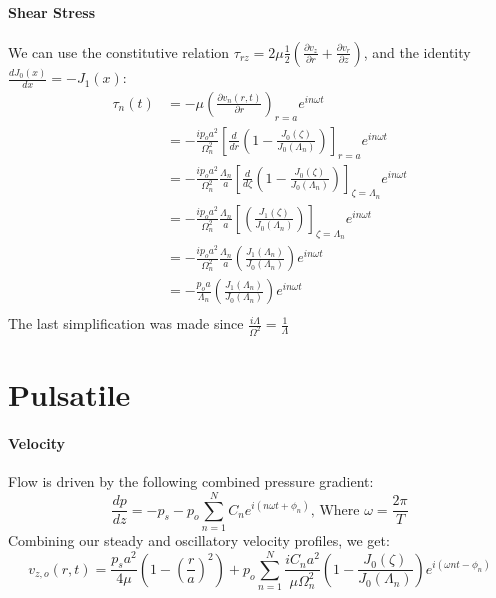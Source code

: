 \documentclass[11pt,letterpaper]{article}
\begin{document}
\paragraph{Shear Stress}
We can use the constitutive relation $\tau_{rz} = 2 \mu \frac{1}{2}\left(    \frac{\partial v_z}{\partial r}+     \frac{\partial v_r}{\partial z}\right)$, and the identity $\frac{d J_0(x)}{d x} = -J_1(x)$:
\begin{align*}
    \tau_n(t) &= -\mu \left(    \frac{\partial v_n(r,t)}{\partial r}\right)_{r=a} e^{i n \omega t}\\
              &= -\frac{i p_o a^2}{\Omega_n^2}\left[\frac{d}{d r}\left(1 - \frac{J_0(\zeta)}{J_0(\Lambda_n)} \right)   \right]_{r=a} e^{i n \omega t}\\
              &= -\frac{i p_o a^2}{\Omega_n^2}\frac{\Lambda_n}{a}\left[\frac{d}{d \zeta}\left(1 - \frac{J_0(\zeta)}{J_0(\Lambda_n)} \right)   \right]_{\zeta=\Lambda_n} e^{i n \omega t}\\
              &= -\frac{i p_o a^2}{\Omega_n^2}\frac{\Lambda_n}{a}\left[\left(\frac{J_1(\zeta)}{J_0(\Lambda_n)} \right)   \right]_{\zeta=\Lambda_n} e^{i n \omega t}\\
              &= -\frac{i p_o a^2}{\Omega_n^2}\frac{\Lambda_n}{a}\left(\frac{J_1(\Lambda_n)}{J_0(\Lambda_n)} \right) e^{i n \omega t}\\
              &= -\frac{p_o a}{\Lambda_n}\left(\frac{J_1(\Lambda_n)}{J_0(\Lambda_n)} \right) e^{i n \omega t}\\
\end{align*}
The last simplification was made since $\frac{i \Lambda}{\Omega^2} = \frac{1}{\Lambda}$
\section*{Pulsatile}
\paragraph{Velocity}
Flow is driven by the following combined pressure gradient:
\[
    \frac{d p}{d z} = -p_s - p_o \sum_{n=1}^N C_n e^{i (n \omega t + \phi_n)} \textrm{, Where $\omega = \frac{2 \pi}{T}$}
\] 
Combining our steady and oscillatory velocity profiles, we get:
\begin{equation*}
    v_{z,o}(r,t) = \frac{p_s a^2}{4 \mu} \left(1 - \left(\frac{r}{a}\right)^2\right) + p_o \displaystyle \sum_{n = 1}^{N} \frac{i C_n a^2}{\mu \Omega_n^2} \left(1 - \frac{J_0 (\zeta)}{J_0 (\Lambda_n)}\right) e^{i (\omega n t - \phi_n)} 
\end{equation*}
\end{document}
